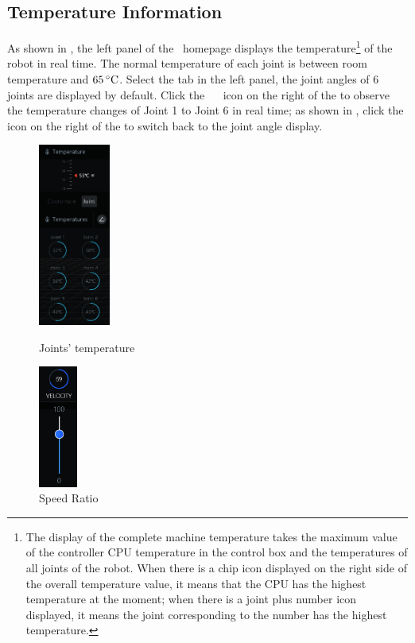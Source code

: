 \clearpage

\subsection{Temperature Information}
As shown in , the left panel of the \LM\ homepage displays the temperature\footnote{The display of the complete machine temperature takes the maximum value of the controller CPU temperature in the control box and the temperatures of all joints of the robot. When there is a chip icon displayed on the right side of the overall temperature value, it means that the CPU has the highest temperature at the moment; when there is a joint plus number icon displayed, it means the joint corresponding to the number has the highest temperature.} of the robot in real time. The normal temperature of each joint is between room temperature and $65\,\mathrm{^\circ C}$.
Select the  tab in the left panel, the joint angles of 6 joints are displayed by default.
Click the ~~ icon on the right of the  to observe the temperature changes of Joint 1 to Joint 6 in real time;
as shown in , click the  icon on the right of the  to switch back to the joint angle display.

\begin{figure}[ht]
		\centering
		\begin{minipage}[t]{0.45\linewidth}
			\centering
			\includegraphics[height=6cm]{en/image/2-12-t.png}
			\caption{Joints' temperature}
			\label{fig:温度信息}
		\end{minipage}
		\begin{minipage}[t]{0.45\linewidth}
			\centering
			\includegraphics[height=4cm]{en/image/2-13.png}
			\caption{Speed Ratio}
			\label{fig:速度比例}
		\end{minipage}
\end{figure}

